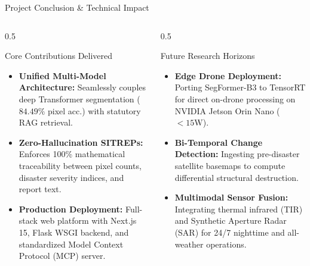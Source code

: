 \documentclass[aspectratio=169, 10pt, professionalfonts]{beamer}
\begin{document}
\begin{frame}{Project Conclusion \& Technical Impact}
  \begin{columns}[T]
    \begin{column}{0.5\textwidth}
      \begin{block}{Core Contributions Delivered}
        \begin{itemize}\setlength{\itemsep}{0.5em}\footnotesize
          \item \textbf{Unified Multi-Model Architecture:} Seamlessly couples deep Transformer segmentation ($84.49\%$ pixel acc.) with statutory RAG retrieval.
          \item \textbf{Zero-Hallucination SITREPs:} Enforces 100\% mathematical traceability between pixel counts, disaster severity indices, and report text.
          \item \textbf{Production Deployment:} Full-stack web platform with Next.js 15, Flask WSGI backend, and standardized Model Context Protocol (MCP) server.
        \end{itemize}
      \end{block}
    \end{column}
    
    \begin{column}{0.5\textwidth}
      \begin{block}{Future Research Horizons}
        \begin{itemize}\setlength{\itemsep}{0.5em}\footnotesize
          \item \textbf{Edge Drone Deployment:} Porting SegFormer-B3 to TensorRT for direct on-drone processing on NVIDIA Jetson Orin Nano ($<15\text{W}$).
          \item \textbf{Bi-Temporal Change Detection:} Ingesting pre-disaster satellite basemaps to compute differential structural destruction.
          \item \textbf{Multimodal Sensor Fusion:} Integrating thermal infrared (TIR) and Synthetic Aperture Radar (SAR) for 24/7 nighttime and all-weather operations.
        \end{itemize}
      \end{block}
    \end{column}
  \end{columns}
\end{frame}
\end{document}
